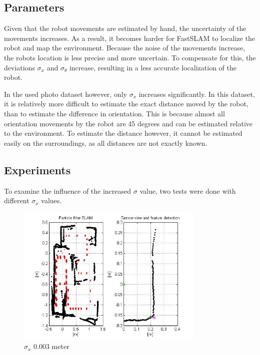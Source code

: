 \documentclass[12pt]{article}
\begin{document}
\subsection{Parameters}
Given that the robot movements are estimated by hand, the uncertainty of the movements increases. As a result, it becomes harder for FastSLAM to localize the robot and map the environment. Because the noise of the movements increase, the robots location is less precise and more uncertain. To compensate for this, the deviations $\sigma_x$ and $\sigma_\theta$ increase, resulting in a less accurate localization of the robot.

In the used photo dataset however, only $\sigma_x$ increases significantly. In this dataset, it is relatively more difficult to estimate the exact distance moved by the robot, than to estimate the difference in orientation. This is because almost all orientation movements by the robot are 45 degrees and can be estimated relative to the environment. To estimate the distance however, it cannot be estimated easily on the surroundings, as all distances are not exactly known.

\subsection{Experiments}
To examine the influence of the increased $\sigma$ value, two tests were done with different $\sigma_x$ values.

\begin{figure}[H]
	\centering
	\includegraphics[width=0.8\textwidth]{own_normal.jpg}
	\caption{$\sigma_x$ 0.003 meter}
\end{figure}
\end{document}
